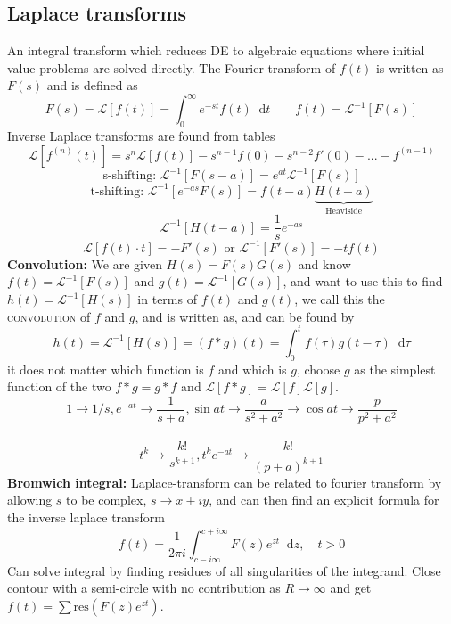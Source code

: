 \documentclass[a4paper, 10pt]{article}
\newcommand*\diff{\mathop{}\!\mathrm{d}}
\begin{document}
\begin{multicols*}{3}
\begin{mdframed}
\subsection*{Laplace transforms}
\end{mdframed}
An integral transform which reduces DE to algebraic equations where initial value problems are solved directly. The Fourier transform of $f(t)$ is written as $F(s)$ and is defined as
$$ F(s) = \mathcal{L}\left[ f(t) \right] = \int_0^\infty e^{-st} f(t) \diff t \qquad f(t) = \mathcal{L}^{-1}\left[ F(s) \right]$$
Inverse Laplace transforms are found from tables
$$ \mathcal{L}\left[ f^{(n)}(t) \right] = s^n\mathcal{L}\left[ f(t) \right]-s^{n-1}f(0)-s^{n-2}f'(0) - ...-f^{(n-1)}$$
$$ \text{s-shifting: }\mathcal{L}^{-1}\left[ F(s-a) \right] = e^{at}\mathcal{L}^{-1}\left[ F(s)\right] $$
$$ \text{t-shifting: }\mathcal{L}^{-1}\left[ e^{-as}F(s) \right] = f(t-a)\underbrace{H(t-a)}_{\text{Heaviside}}$$
$$ \mathcal{L}^{-1}\left[ H(t-a) \right] = \frac{1}{s}e^{-as}$$
$$ \mathcal{L}\left[ f(t)\cdot t \right] = -F'(s) \text{  or  } \mathcal{L}^{-1}\left[F'(s)\right] = -tf(t)$$
\textbf{Convolution:}
We are given $H(s) = F(s)G(s)$ and know $f(t) = \mathcal{L}^{-1}\left[F(s)\right]$ and $g(t) = \mathcal{L}^{-1}\left[G(s)\right]$, and want to use this to find $h(t) = \mathcal{L}^{-1}\left[H(s)\right]$ in terms of $f(t)$ and $g(t)$, we call this the \textsc{convolution} of $f$ and $g$, and is written as, and can be found by
$$h(t) = \mathcal{L}^{-1}\left[H(s)\right] = \left( f*g\right)(t) = \int_0^t f(\tau)g(t-\tau) \diff \tau$$
it does not matter which function is $f$ and which is $g$, choose $g$ as the simplest function of the two $f*g=g*f$ and $\mathcal{L}\left[f*g\right]=\mathcal{L}\left[f\right]\mathcal{L}\left[g\right]$.\\
$$1\rightarrow 1/s, e^{-at} \rightarrow \frac{1}{s+a}, \sin{at}\rightarrow\frac{a}{s^2+a^2}\rightarrow \cos{at}\rightarrow \frac{p}{p^2+a^2} $$\\
$$t^k \rightarrow \frac{k!}{s^{k+1}}, t^ke^{-at}\rightarrow \frac{k!}{\left(p+a\right)^{k+1}} $$
\textbf{Bromwich integral:}
Laplace-transform can be related to fourier transform by allowing $s$ to be complex, $s\rightarrow x+iy$, and can then find an explicit formula for the inverse laplace transform
$$ f(t) = \frac{1}{2\pi i}\int_{c-i\infty}^{c+i\infty} F(z)e^{zt} \diff z, \quad t>0$$
Can solve integral by finding residues of all singularities of the integrand. Close contour with a semi-circle with no contribution as $R\rightarrow \infty$ and get $f(t) = \sum \text{res}(F(z)e^{zt})$.



\end{multicols*}
\end{document}
